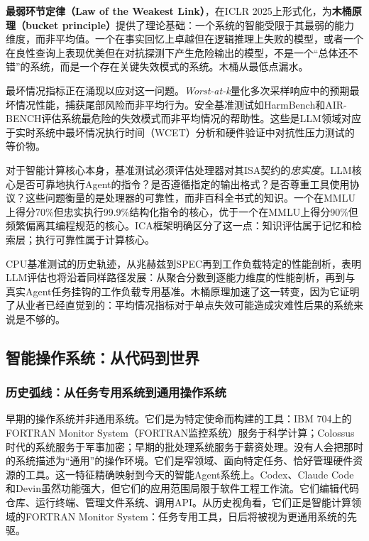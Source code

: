 \textbf{最弱环节定律（Law of the Weakest Link）}，在ICLR 2025上形式化，为\textbf{木桶原理（bucket principle）}提供了理论基础：一个系统的智能受限于其最弱的能力维度，而非平均值\cite{zhong_2024_weakest_link}。一个在事实回忆上卓越但在逻辑推理上失败的模型，或者一个在良性查询上表现优美但在对抗探测下产生危险输出的模型，不是一个``总体还不错''的系统，而是一个存在关键失效模式的系统。木桶从最低点漏水。

最坏情况指标正在涌现以应对这一问题。\textit{Worst-at-k}量化多次采样响应中的预期最坏情况性能，捕获尾部风险而非平均行为。安全基准测试如HarmBench和AIR-BENCH评估系统最危险的失效模式而非平均情况的帮助性\cite{harmbench_2024, airbench_2024}。这些是LLM领域对应于实时系统中最坏情况执行时间（WCET）分析和硬件验证中对抗性压力测试的等价物。

对于智能计算核心本身，基准测试必须评估处理器对其ISA契约的\textit{忠实度}。LLM核心是否可靠地执行Agent的指令？是否遵循指定的输出格式？是否尊重工具使用协议？这些问题衡量的是处理器的可靠性，而非百科全书式的知识。一个在MMLU上得分70\%但忠实执行99.9\%结构化指令的核心，优于一个在MMLU上得分90\%但频繁偏离其编程规范的核心。ICA框架明确区分了这一点：知识评估属于记忆和检索层；执行可靠性属于计算核心。

CPU基准测试的历史轨迹，从兆赫兹到SPEC再到工作负载特定的性能剖析，表明LLM评估也将沿着同样路径发展：从聚合分数到逐能力维度的性能剖析，再到与真实Agent任务挂钩的工作负载专用基准。木桶原理加速了这一转变，因为它证明了从业者已经直觉到的：平均情况指标对于单点失效可能造成灾难性后果的系统来说是不够的。





\subsection{智能操作系统：从代码到世界}

\subsubsection{历史弧线：从任务专用系统到通用操作系统}

早期的操作系统并非通用系统。它们是为特定使命而构建的工具：IBM 704上的FORTRAN Monitor System（FORTRAN监控系统）服务于科学计算；Colossus时代的系统服务于军事加密；早期的批处理系统服务于薪资处理。没有人会把那时的系统描述为``通用''的操作环境。它们是窄领域、面向特定任务、恰好管理硬件资源的工具。这一特征精确映射到今天的智能Agent系统上。Codex、Claude Code和Devin虽然功能强大，但它们的应用范围局限于软件工程工作流。它们编辑代码仓库、运行终端、管理文件系统、调用API。从历史视角看，它们正是智能计算领域的FORTRAN Monitor System：任务专用工具，日后将被视为更通用系统的先驱。

